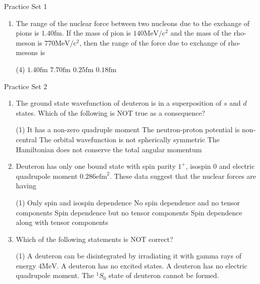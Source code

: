 \newpage
\begin{abox}
Practice Set 1
	\end{abox}
\begin{enumerate}
	\item The range of the nuclear force between two nucleons due to the exchange of pions is $1.40 \mathrm{fm}$. If the mass of pion is $140 \mathrm{MeV} / \mathrm{c}^{2}$ and the mass of the rho-meson is $770 \mathrm{MeV} / \mathrm{c}^{2}$, then the range of the force due to exchange of rho-mesons is
{}
\begin{tasks}(4)
	\task[\textbf{A.}] $1.40 \mathrm{fm}$
	\task[\textbf{B.}]$7.70 \mathrm{fm}$
	\task[\textbf{C.}]$0.25 \mathrm{fm}$
	\task[\textbf{D.}]$0.18 \mathrm{fm}$
\end{tasks}
\end{enumerate}
\newpage
\begin{abox}
Practice Set 2
	\end{abox}
\begin{enumerate}
\item The ground state wavefunction of deuteron is in a superposition of $s$ and $d$ states. Which of the following is NOT true as a consequence?
{}
\begin{tasks}(1)
	\task[\textbf{A.}] It has a non-zero quadruple moment 
	\task[\textbf{B.}]The neutron-proton potential is non-central
	\task[\textbf{C.}] The orbital wavefunction is not spherically symmetric
	\task[\textbf{D.}]The Hamiltonian does not conserve the total angular momentum
\end{tasks}
\item Deuteron has only one bound state with spin parity $1^{+}$, isospin 0 and electric quadrupole moment $0.286 \mathrm{efm}^{2}$. These data suggest that the nuclear forces are having
{}
\begin{tasks}(1)
	\task[\textbf{A.}] Only spin and isospin dependence
	\task[\textbf{B.}] No spin dependence and no tensor components
	\task[\textbf{C.}]Spin dependence but no tensor components
	\task[\textbf{D.}]Spin dependence along with tensor components
\end{tasks}
\item Which of the following statements is NOT correct?
{}
\begin{tasks}(1)
	\task[\textbf{A.}] A deuteron can be disintegrated by irradiating it with gamma rays of energy $4 \mathrm{MeV}$.
	\task[\textbf{B.}] A deuteron has no excited states.
	\task[\textbf{C.}] A deuteron has no electric quadrupole moment.
	\task[\textbf{D.}] The ${ }^{1} S_{0}$ state of deuteron cannot be formed.
\end{tasks}	
\end{enumerate}

